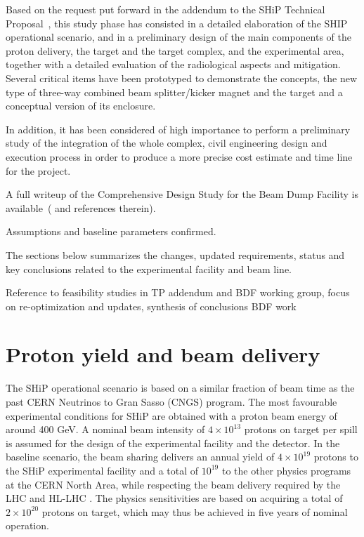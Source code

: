 Based on the request put forward in the addendum to the SHiP Technical Proposal~\cite{ref:ship_tp_add}, this study phase has 
consisted in a detailed elaboration of the SHIP operational scenario, and in a preliminary design of the main components of the 
proton delivery, the target and the target complex, and the experimental area, together with a detailed evaluation of the 
radiological aspects and mitigation. Several critical items have been prototyped to demonstrate the concepts, the new type of 
three-way combined beam splitter/kicker magnet and the target and a conceptual version of its enclosure.

In addition, it has been considered of high importance to perform a preliminary study of
the integration of the whole complex, civil engineering design and execution process in order to produce a more precise cost 
estimate and time line for the project.

A full writeup of the Comprehensive Design Study for the Beam Dump Facility is available~(\cite{ref:bdf_yellowreport} and references therein).

Assumptions and baseline parameters confirmed.

The sections below summarizes the changes, updated requirements, status and key conclusions related to the experimental facility and beam line.

Reference to feasibility studies in TP addendum and BDF working group, focus on re-optimization and updates, synthesis of conclusions BDF work



\section{Proton yield and beam delivery}

The SHiP operational scenario is based on a similar fraction of beam time as the past CERN Neutrinos to Gran Sasso (CNGS) program. The most favourable experimental conditions for SHiP are obtained with a proton beam energy of around 400 GeV. A nominal beam intensity of $4\times10^{13}$ protons on target per spill is assumed for the design of the experimental facility and the detector. In the baseline scenario, the beam sharing delivers an annual yield of $4\times 10^{19}$ protons to the SHiP experimental facility and a total of $10^{19}$ to the other physics programs at the CERN North Area, while respecting the beam delivery required by the LHC and HL-LHC . The physics sensitivities are based on acquiring a total of $2\times 10^{20}$ protons on target, which may thus be achieved in five years of nominal operation.

